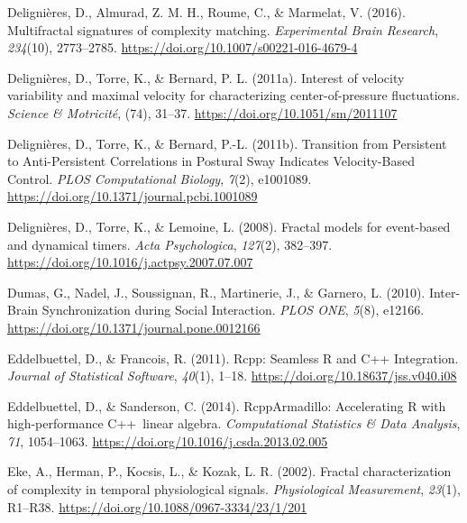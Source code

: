 \documentclass[
  man]{apa6}
\newlength{\cslhangindent}
\newlength{\cslentryspacingunit} %
\newenvironment{CSLReferences}[2] %
 {%
  \setlength{\parindent}{0pt}
  \ifodd #1
  \let\oldpar\par
  \def\par{\hangindent=\cslhangindent\oldpar}
  \fi
  \setlength{\parskip}{#2\cslentryspacingunit}
 }%
 {}
\begin{document}
\begin{CSLReferences}{1}{0}
\leavevmode{}%
Delignières, D., Almurad, Z. M. H., Roume, C., \& Marmelat, V. (2016). Multifractal signatures of complexity matching. \emph{Experimental Brain Research}, \emph{234}(10), 2773--2785. \url{https://doi.org/10.1007/s00221-016-4679-4}

\leavevmode{}%
Delignières, D., Torre, K., \& Bernard, P. L. (2011a). Interest of velocity variability and maximal velocity for characterizing center-of-pressure fluctuations. \emph{Science \& Motricité}, (74), 31--37. \url{https://doi.org/10.1051/sm/2011107}

\leavevmode{}%
Delignières, D., Torre, K., \& Bernard, P.-L. (2011b). Transition from {Persistent} to {Anti}-{Persistent} {Correlations} in {Postural} {Sway} {Indicates} {Velocity}-{Based} {Control}. \emph{PLOS Computational Biology}, \emph{7}(2), e1001089. \url{https://doi.org/10.1371/journal.pcbi.1001089}

\leavevmode{}%
Delignières, D., Torre, K., \& Lemoine, L. (2008). Fractal models for event-based and dynamical timers. \emph{Acta Psychologica}, \emph{127}(2), 382--397. \url{https://doi.org/10.1016/j.actpsy.2007.07.007}

\leavevmode{}%
Dumas, G., Nadel, J., Soussignan, R., Martinerie, J., \& Garnero, L. (2010). Inter-{Brain} {Synchronization} during {Social} {Interaction}. \emph{PLOS ONE}, \emph{5}(8), e12166. \url{https://doi.org/10.1371/journal.pone.0012166}

\leavevmode{}%
Eddelbuettel, D., \& Francois, R. (2011). Rcpp: {Seamless} {R} and {C}++ {Integration}. \emph{Journal of Statistical Software}, \emph{40}(1), 1--18. \url{https://doi.org/10.18637/jss.v040.i08}

\leavevmode{}%
Eddelbuettel, D., \& Sanderson, C. (2014). {RcppArmadillo}: {Accelerating} {R} with high-performance {C}++~linear algebra. \emph{Computational Statistics \& Data Analysis}, \emph{71}, 1054--1063. \url{https://doi.org/10.1016/j.csda.2013.02.005}

\leavevmode{}%
Eke, A., Herman, P., Kocsis, L., \& Kozak, L. R. (2002). Fractal characterization of complexity in temporal physiological signals. \emph{Physiological Measurement}, \emph{23}(1), R1--R38. \url{https://doi.org/10.1088/0967-3334/23/1/201}


\end{CSLReferences}
\end{document}
